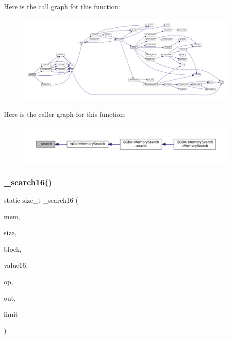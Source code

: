 Here is the call graph for this function\+:
\nopagebreak
\begin{figure}[H]
\begin{center}
\leavevmode
\includegraphics[width=350pt]{mem-search_8c_add108d0650bfe6f0112626eb68ad814e_cgraph}
\end{center}
\end{figure}
Here is the caller graph for this function\+:
\nopagebreak
\begin{figure}[H]
\begin{center}
\leavevmode
\includegraphics[width=350pt]{mem-search_8c_add108d0650bfe6f0112626eb68ad814e_icgraph}
\end{center}
\end{figure}
\mbox{\label{mem-search_8c_aa1dc9e477a1b7df5ce90e5bae240e763}} 
\subsubsection{\texorpdfstring{\+\_\+search16()}{\_search16()}}
{\footnotesize\ttfamily static size\+\_\+t \+\_\+search16 (\begin{DoxyParamCaption}\item[{const void $\ast$}]{mem,  }\item[{size\+\_\+t}]{size,  }\item[{const struct m\+Core\+Memory\+Block $\ast$}]{block,  }\item[{uint16\+\_\+t}]{value16,  }\item[{enum m\+Core\+Memory\+Search\+Op}]{op,  }\item[{struct m\+Core\+Memory\+Search\+Results $\ast$}]{out,  }\item[{size\+\_\+t}]{limit }\end{DoxyParamCaption})\hspace{0.3cm}{\ttfamily [static]}}

